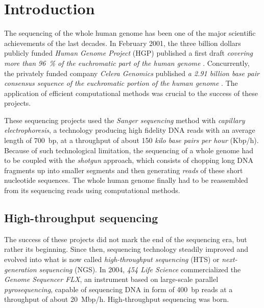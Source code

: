 \chapter{Introduction}

The sequencing of the whole human genome has been one of the major scientific achievements of the last decades.
In February 2001, the three billion dollars publicly funded \emph{Human Genome Project} (HGP) published a first draft \emph{covering more than 96~\% of the euchromatic part of the human genome} \citep{Consortium2001}.
Concurrently, the privately funded company \emph{Celera Genomics} published \emph{a 2.91 billion base pair consensus sequence of the euchromatic portion of the human genome} \citep{Venter2001}.
The application of efficient computational methods was crucial to the success of these projects.


These sequencing projects used the \emph{Sanger sequencing} method \citep{Sanger1977} with \emph{capillary electrophoresis}, a technology producing high fidelity DNA reads with an average length of 700~bp, at a throughput of about 150 \emph{kilo base pairs per hour} (Kbp/h).
Because of such technological limitation, the sequencing of a whole genome had to be coupled with the \emph{shotgun} approach, 
which consists of chopping long DNA fragments up into smaller segments and then generating \emph{reads} of these short nucleotide sequences.
The whole human genome finally had to be reassembled from its sequencing reads using computational methods.



\section{High-throughput sequencing}
\label{sec:intro:hts}

The success of these projects did not mark the end of the sequencing era, but rather its beginning.
Since then, sequencing technology steadily improved and evolved into what is now called \emph{high-throughput sequencing} (HTS) or \emph{next-generation sequencing} (NGS).
In 2004, \emph{454 Life Science} commercialized the \emph{Genome Sequencer FLX}, an instrument based on large-scale parallel \emph{pyrosequencing}, capable of sequencing DNA in form of 400~bp reads at a throughput of about 20~Mbp/h.
High-throughput sequencing was born.

